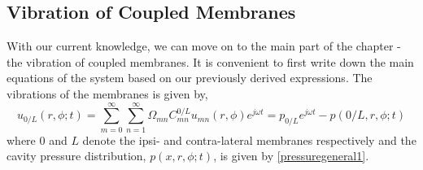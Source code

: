 
\subsection{Vibration of Coupled Membranes}
With our current knowledge, we can move on to the main part of the chapter - the vibration of coupled membranes.
It is convenient to first write down the main equations of the system based on our previously derived expressions.
The vibrations of the membranes is given by,
\begin{equation}
 u_{0/L}(r,\phi;t)=\displaystyle\sum^{\infty}_{m=0}\sum^{\infty}_{n=1}\Omega_{mn}C^{0/L}_{mn}u_{mn}(r,\phi)e^{j\omega t}=p_{0/L}e^{j\omega t}-p(0/L,r,\phi;t)
\end{equation}
where $0$ and $L$ denote the ipsi- and contra-lateral membranes respectively and the cavity pressure distribution, $p(x,r,\phi;t)$,  is given by \eqref{pressuregeneral1}.